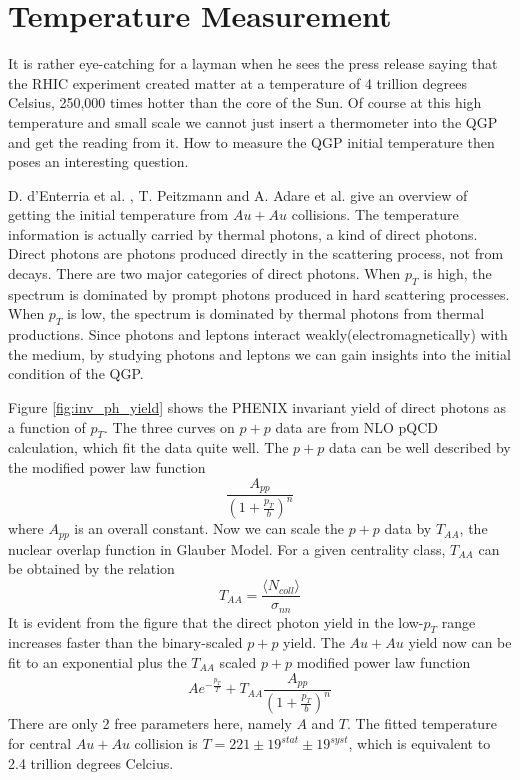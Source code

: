 \documentclass[11pt]{article} %
\begin{document}

\section{Temperature Measurement}

It is rather eye-catching for a layman when he sees the press release saying that the RHIC experiment created matter at a temperature of 4 trillion degrees Celsius, 250,000 times hotter than the core of the Sun. Of course at this high temperature and small scale we cannot just insert a thermometer into the QGP and get the reading from it. How to measure the QGP initial temperature then poses an interesting question.

D. d'Enterria et al. \cite{enterria06}, T. Peitzmann \cite{peitzmann} and A. Adare et al. \cite{adare09} give an overview of getting the initial temperature from $Au+Au$ collisions. The temperature information is actually carried by thermal photons, a kind of direct photons. Direct photons are photons produced directly in the scattering process, not from decays. There are two major categories of direct photons. When $p_T$ is high, the spectrum is dominated by prompt photons produced in hard scattering processes. When $p_T$ is low, the spectrum is dominated by thermal photons from thermal productions. Since photons and leptons interact weakly(electromagnetically) with the medium, by studying photons and leptons we can gain insights into the initial condition of the QGP.

Figure \ref{fig:inv_ph_yield} shows the PHENIX invariant yield of direct photons as a function of $p_T$. The three curves on $p+p$ data are from NLO pQCD calculation, which fit the data quite well. The $p+p$ data can be well described by the modified power law function
\begin{equation}
\frac{A_{pp}}{\left( 1+\frac{p_T}{b} \right)^n}
\end{equation}
where $A_{pp}$ is an overall constant. Now we can scale the $p+p$ data by $T_{AA}$, the nuclear overlap function in Glauber Model. For a given centrality class, $T_{AA}$ can be obtained by the relation \cite{tannenbaum}
\begin{equation}
T_{AA}=\frac{\langle N_{coll} \rangle}{\sigma_{nn}}
\end{equation}
It is evident from the figure that the direct photon yield in the low-$p_T$ range increases faster than the binary-scaled $p+p$ yield. The $Au+Au$ yield now can be fit to an exponential plus the $T_{AA}$ scaled $p+p$ modified power law function
\begin{equation}
Ae^{-\frac{p_T}{T}}+T_{AA}\frac{A_{pp}}{\left( 1+\frac{p_T}{b} \right)^n}
\end{equation}
There are only 2 free parameters here, namely $A$ and $T$. The fitted temperature for central $Au+Au$ collision is $T=221\pm 19^{stat} \pm 19^{syst}$, which is equivalent to 2.4 trillion degrees Celcius.
\end{document}
